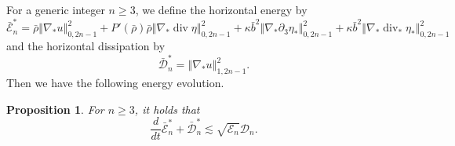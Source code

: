 \documentclass[a4paper,reqno,11pt]{amsart}
\numberwithin{equation}{section}
\providecommand{\norm}[1]{\left\Vert#1\right\Vert}
\providecommand{\sd}[1]{\mathcal{D}_{#1}}
\providecommand{\se}[1]{\mathcal{E}_{#1}}
\providecommand{\norm}[1]{\left\Vert#1\right\Vert}
\newtheorem{prop}[lem]{Proposition}
\begin{document}
For a generic integer $n\ge 3$, we define the  horizontal energy by
\begin{equation}
 \bar{\mathcal{E}}^{\ast}_{n} =  \bar\rho \norm{\nabla_\ast u}_{0,2n-1}^2+P'(\bar\rho)\bar\rho \norm{ \nabla_\ast \operatorname{div} \eta}_{0,2n-1}^2 +\kappa\bar b^2 \norm{ \nabla_\ast {\partial}_3\eta_\ast}_{0,2n-1}^2
  +\kappa\bar b^2 \norm{ \nabla_\ast\operatorname{div}_\ast\eta_\ast}_{0,2n-1}^2
\end{equation}
and the horizontal dissipation by
\begin{equation}
 \bar{\mathcal{D}}_n^{\ast} = \norm{ \nabla_\ast  u }_{1,2n-1}^2 .
\end{equation}
Then we have the following energy evolution.

\begin{prop}\label{p_upper_evolution  N12c}
For $n\ge 3$, it holds that
\begin{equation}\label{p_u_e_00c}
\frac{d}{dt}\bar{\mathcal{E}}^{\ast}_{n}+\bar{\mathcal{D}}_{n}^{\ast}{\lesssim}\sqrt{ \se{n}  } \sd{n} .
\end{equation}
\end{prop}
\end{document}
